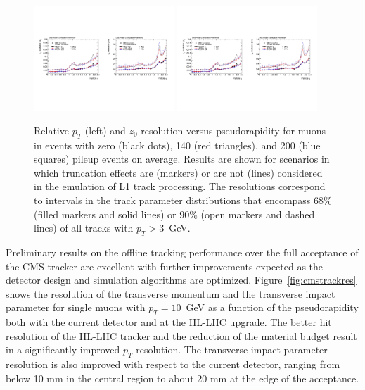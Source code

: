 \begin{figure}[h!tbp]
\begin{center}
  \includegraphics[width=0.47\textwidth]{figures/cmsupgrade/TDR-17-001_fig6_8_a.pdf} \hfill
  \includegraphics[width=0.47\textwidth]{figures/cmsupgrade/TDR-17-001_fig6_8_b.pdf}
  \caption{ Relative $p_T$ (left) and $z_0$ resolution versus pseudorapidity for muons in \ttbar events with zero (black dots), 140 (red triangles), and 200 (blue squares) pileup events on average. 
Results are shown for scenarios in which truncation effects are (markers) or are not (lines) considered in the emulation of L1 track processing. 
The resolutions correspond to intervals in the track parameter distributions that encompass $68\%$ (filled markers and solid lines) or $90\%$ (open markers and dashed lines) of all tracks with $p_T > 3$~GeV.  }
  \label{fig:cmsL1tracks}
\end{center}
\end{figure}

Preliminary results on the offline tracking performance over the full acceptance of the CMS tracker are excellent with further improvements expected as the detector design and simulation algorithms are optimized.
Figure~\ref{fig:cmstrackres} shows the resolution of the transverse momentum and the transverse impact parameter
for single muons with $p_T = 10$~GeV as a function of the pseudorapidity both with the current
detector and at the HL-LHC upgrade. The better hit resolution of the HL-LHC tracker and the reduction of the material budget result in a significantly improved
$p_T$ resolution. The transverse impact parameter resolution is also improved with respect to the current detector, ranging from below 10 mm in the central region to about 20 mm at the edge of the acceptance.

